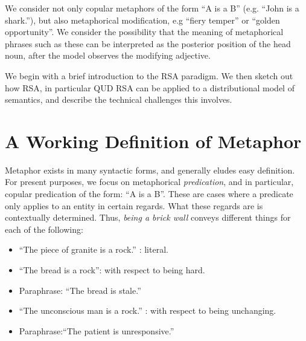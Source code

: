\documentclass[10pt,letterpaper,twocolumn]{article}
\begin{document}
We consider not only copular metaphors of the form ``A is a B'' (e.g. ``John is a shark.''), but also metaphorical modification, e.g ``fiery temper'' or ``golden opportunity''. We consider the possibility that the meaning of metaphorical phrases such as these can be interpreted as the posterior position of the head noun, after the model observes the modifying adjective.

We begin with a brief introduction to the RSA paradigm. We then sketch out how RSA, in particular QUD RSA can be applied to a distributional model of semantics, and describe the technical challenges this involves.

\section{A Working Definition of Metaphor}


Metaphor exists in many syntactic forms, and generally eludes easy definition. For present purposes, we focus on metaphorical \emph{predication}, and in particular, copular predication of the form: ``A is a B''. These are cases where a predicate only applies to an entity in certain regards. What these regards are is contextually determined. Thus, \emph{being a brick wall} conveys different things for each of the following:

	\begin{exe}
	\ex
	\begin{itemize}
	\item ``The piece of granite is a rock.'' : literal.
	\end{itemize} \label{first}
	\ex
	\begin{itemize}
	\item ``The bread is a rock'': with respect to being hard.
	\item Paraphrase: ``The bread is stale.''
	\end{itemize}
	\ex
	\begin{itemize}
	\item ``The unconscious man is a rock.'' : with respect to being unchanging.
	\item Paraphrase:``The patient is unresponsive.''
	\end{itemize}
	\label{third}
	\end{exe}
\end{document}
